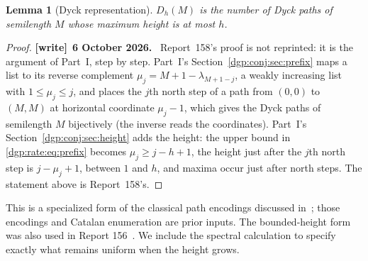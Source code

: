 \documentclass[11pt,letterpaper]{article}
\numberwithin{equation}{section}
\newtheorem{lemma}[theorem]{Lemma}
\theoremstyle{remark}\newtheorem{remark}[theorem]{Remark}
\newenvironment{writenote}[1][]{\par\smallskip\begingroup\small
 \noindent\textbf{[write]}\if\relax\detokenize{#1}\relax\else~\textbf{#1.}\fi\ }%
 {\par\endgroup\smallskip}
\begin{document}
\begin{lemma}[Dyck representation]\label{dgp:rate:lem:dyck}
$D_h(M)$ is the number of Dyck paths of semilength $M$ whose maximum
height is at most $h$.
\end{lemma}
\begin{proof}
\begin{writenote}[6 October 2026]
Report~158's proof is not reprinted: it is the argument of Part~I, step by step. Part~I's Section~\ref{dgp:conj:sec:prefix} maps a list to its reverse complement $\mu_j=M+1-\lambda_{M+1-j}$, a weakly increasing list with $1\le\mu_j\le j$, and places the $j$th north step of a path from $(0,0)$ to $(M,M)$ at horizontal coordinate $\mu_j-1$, which gives the Dyck paths of semilength $M$ bijectively (the inverse reads the coordinates). Part~I's Section~\ref{dgp:conj:sec:height} adds the height: the upper bound in \eqref{dgp:rate:eq:prefix} becomes $\mu_j\ge j-h+1$, the height just after the $j$th north step is $j-\mu_j+1$, between $1$ and $h$, and maxima occur just after north steps. The statement above is Report~158's.
\end{writenote}
\end{proof}

This is a specialized form of the classical path encodings discussed
in~\cite{abek}; those encodings and Catalan enumeration are prior inputs.
The bounded-height form was also used in Report 156~\cite{r156}.
We include the spectral calculation to specify exactly what remains
uniform when the height grows.
\end{document}
